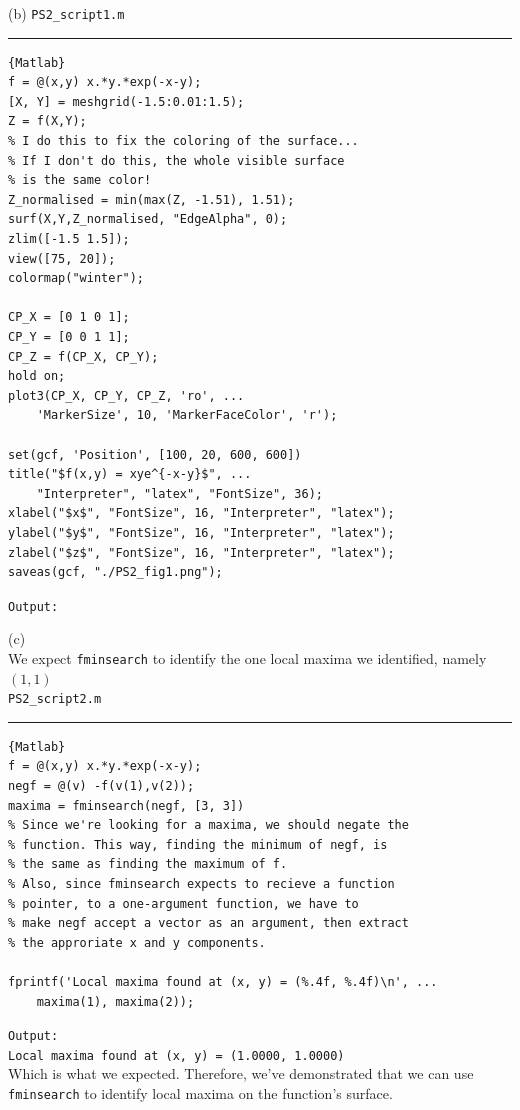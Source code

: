\documentclass[a4paper, 11pt]{report}
\begin{document}
\pagebreak
\sol (b)
\verb|PS2_script1.m| \hrule
\begin{lstlisting}{Matlab}
f = @(x,y) x.*y.*exp(-x-y);
[X, Y] = meshgrid(-1.5:0.01:1.5);
Z = f(X,Y);
% I do this to fix the coloring of the surface...
% If I don't do this, the whole visible surface
% is the same color!
Z_normalised = min(max(Z, -1.51), 1.51);
surf(X,Y,Z_normalised, "EdgeAlpha", 0);
zlim([-1.5 1.5]);
view([75, 20]);
colormap("winter");

CP_X = [0 1 0 1];
CP_Y = [0 0 1 1];
CP_Z = f(CP_X, CP_Y);
hold on;
plot3(CP_X, CP_Y, CP_Z, 'ro', ...
	'MarkerSize', 10, 'MarkerFaceColor', 'r');

set(gcf, 'Position', [100, 20, 600, 600])
title("$f(x,y) = xye^{-x-y}$", ...
	"Interpreter", "latex", "FontSize", 36);
xlabel("$x$", "FontSize", 16, "Interpreter", "latex");
ylabel("$y$", "FontSize", 16, "Interpreter", "latex");
zlabel("$z$", "FontSize", 16, "Interpreter", "latex");
saveas(gcf, "./PS2_fig1.png");
\end{lstlisting}
\verb|Output:|
\begin{center}
\end{center}

\pagebreak
\sol (c)\\
We expect \verb|fminsearch| to identify the one local maxima we identified, namely $(1,1)$ \\
\verb|PS2_script2.m| \hrule
\begin{lstlisting}{Matlab}
f = @(x,y) x.*y.*exp(-x-y);
negf = @(v) -f(v(1),v(2));
maxima = fminsearch(negf, [3, 3])
% Since we're looking for a maxima, we should negate the 
% function. This way, finding the minimum of negf, is 
% the same as finding the maximum of f.
% Also, since fminsearch expects to recieve a function 
% pointer, to a one-argument function, we have to
% make negf accept a vector as an argument, then extract
% the approriate x and y components.

fprintf('Local maxima found at (x, y) = (%.4f, %.4f)\n', ...
	maxima(1), maxima(2));
\end{lstlisting}
\verb|Output:|\\

\verb|Local maxima found at (x, y) = (1.0000, 1.0000)| \\

Which is what we expected. Therefore, we've demonstrated that we can use \verb|fminsearch| to identify local maxima on the function's surface.
\end{document}
